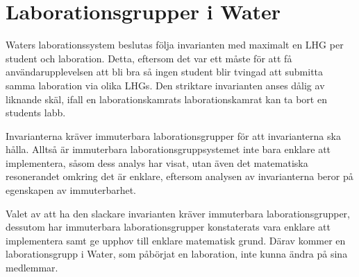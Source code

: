 \section{Laborationsgrupper i Water}

Waters laborationssystem beslutas följa invarianten med maximalt en LHG per student
och laboration. Detta, eftersom det var ett måste för att få användarupplevelsen
att bli bra så ingen student blir tvingad att submitta samma laboration via olika
LHGs. Den striktare invarianten anses dålig av liknande skäl, ifall en 
laborationskamrats laborationskamrat kan ta bort en students labb.

Invarianterna kräver immuterbara laborationsgrupper för att invarianterna ska
hålla. Alltså är immuterbara laborationsgruppsystemet inte bara enklare att
implementera, såsom dess analys har visat, utan även det matematiska
resonerandet omkring det är enklare, eftersom analysen av invarianterna beror
på egenskapen av immuterbarhet.

Valet av att ha den slackare invarianten kräver immuterbara laborationsgrupper,
dessutom har immuterbara laborationsgrupper konstaterats vara enklare att implementera
samt ge upphov till enklare matematisk grund. Därav kommer en laborationsgrupp
i Water, som påbörjat en laboration, inte kunna ändra på sina medlemmar.
